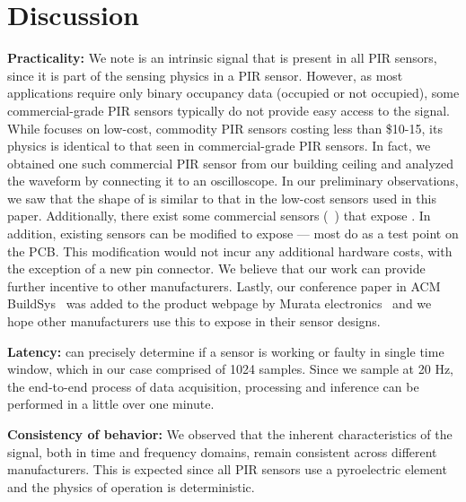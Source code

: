 \section{Discussion}

\noindent\textbf{Practicality:} We note \aout is an intrinsic signal that is present in all PIR sensors, since it is part of the sensing physics in a PIR sensor. 
However, as most applications require only binary occupancy data (\ie occupied or not occupied), some commercial-grade PIR sensors typically do not provide easy access to the \aout signal.
While \sol focuses on low-cost, commodity PIR sensors costing less than \$10-15, its physics is identical to that seen in commercial-grade PIR sensors. In fact, we obtained one such commercial PIR sensor from our building ceiling and analyzed the \aout waveform by connecting it to an oscilloscope. In our preliminary observations, we saw that the shape of \aout is similar to that in the low-cost sensors used in this paper.
Additionally, there exist some commercial sensors (\eg~\cite{panasonic_amn22111,panasonic_amn23111}) that expose \aout.
In addition, existing sensors can be modified to expose \aout --- most do as a test point on the PCB. This modification would not incur any additional hardware costs, with the exception of a new pin connector. We believe that our work can provide further incentive to other manufacturers. Lastly, our conference paper in ACM BuildSys~\cite{10.1145/3486611.3486658} was added to the product webpage by Murata electronics~\cite{murata_imx070_manual} and we hope other manufacturers use this to expose \aout in their sensor designs.

\noindent \textbf{Latency:} \sol can precisely determine if a sensor is working or faulty in single time window, which in our case comprised of 1024 samples. Since we sample at 20 Hz, the end-to-end process of data acquisition, processing and inference can be performed in a little over one minute.

\noindent\textbf{Consistency of behavior:} We observed that the inherent characteristics of the \aout signal, both in time and frequency domains, remain consistent across different manufacturers. This is expected since all PIR sensors use a pyroelectric element and the physics of operation is deterministic.

